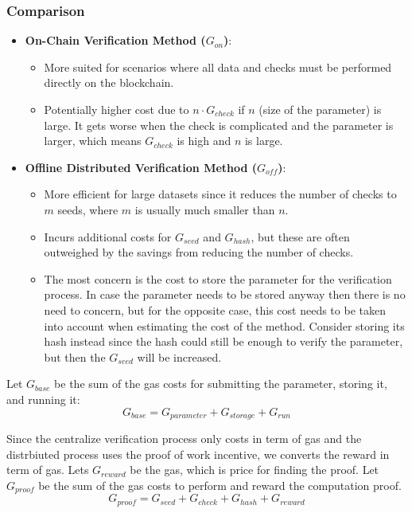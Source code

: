 \documentclass[runningheads]{llncs}
\begin{document}
\subsubsection*{Comparison}

\begin{itemize}
    \item \textbf{On-Chain Verification Method (\( G_{on} \))}:
    \begin{itemize}
        \item More suited for scenarios where all data and checks must be performed directly on the blockchain.
        \item Potentially higher cost due to \( n \cdot G_{check} \) if \( n \) (size of the parameter) is large. It gets worse when the check is complicated and the parameter is larger, which means \( G_{check} \) is high and \( n \) is large.
    \end{itemize}
    
    \item \textbf{Offline Distributed Verification Method (\( G_{off} \))}:
    \begin{itemize}
        \item More efficient for large datasets since it reduces the number of checks to \( m \) seeds, where \( m \) is usually much smaller than \( n \).
        \item Incurs additional costs for \( G_{seed} \) and \( G_{hash} \), but these are often outweighed by the savings from reducing the number of checks.
        \item The most concern is the cost to store the parameter for the verification process. In case the parameter needs to be stored anyway then there is no need to concern, but for the opposite case, this cost needs to be taken into account when estimating the cost of the method. Consider storing its hash instead since the hash could still be enough to verify the parameter, but then the \( G_{seed} \) will be increased.
    \end{itemize}
\end{itemize}

Let \( G_{base} \) be the sum of the gas costs for submitting the parameter, storing it, and running it:
\[
G_{base} = G_{parameter} + G_{storage} + G_{run}
\]

Since the centralize verification process only costs in term of gas and the distrbiuted process uses the proof of work incentive, we converts the reward in term of gas. Lets $G_{reward}$ be the gas, which is price for finding the proof. Let \( G_{proof} \) be the sum of the gas costs to perform and reward the  computation proof. 
\[
G_{proof} = G_{seed} + G_{check} + G_{hash} + G_{reward} 
\]
\end{document}
